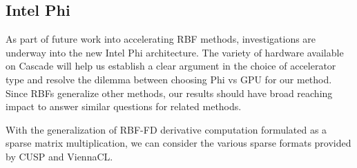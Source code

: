 \documentclass{report}
\begin{document}
\subsection{Intel Phi} 

As part of future work into accelerating RBF methods, investigations are underway into the new Intel Phi architecture. The variety of hardware available on Cascade will help us establish a clear argument in the choice of accelerator type and resolve the dilemma between choosing Phi vs GPU for our method. Since RBFs generalize other methods, our results should have broad reaching impact to answer similar questions for related methods.


With the generalization of RBF-FD derivative computation formulated as a sparse matrix multiplication, we can 
consider the various sparse formats provided by CUSP and ViennaCL. 

\end{document}
